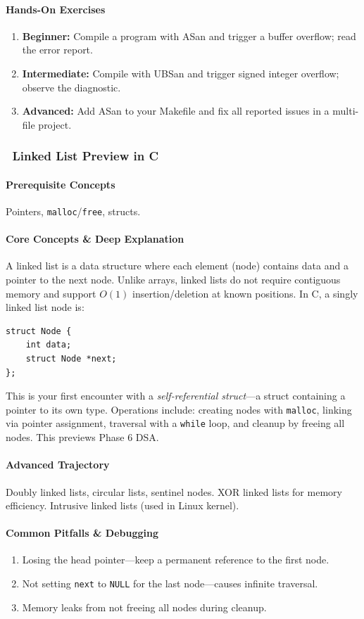 \documentclass[11pt, a4paper, oneside]{report}
\newcommand{\awareness}[1]{\subsubsection{\texorpdfstring{\fcolorbox{gray!50}{gray!10}{\footnotesize\bfseries\color{gray!50!black} AWARENESS}~#1}{#1}}}
\begin{document}
\paragraph{Hands-On Exercises}
\begin{enumerate}[leftmargin=*]
\item \textbf{Beginner:} Compile a program with ASan and trigger a buffer overflow; read the error report.
\item \textbf{Intermediate:} Compile with UBSan and trigger signed integer overflow; observe the diagnostic.
\item \textbf{Advanced:} Add ASan to your Makefile and fix all reported issues in a multi-file project.
\end{enumerate}

\awareness{Linked List Preview in C}

\paragraph{Prerequisite Concepts} Pointers, \texttt{malloc}/\texttt{free}, structs.

\paragraph{Core Concepts \& Deep Explanation} A linked list is a data structure where each element (node) contains data and a pointer to the next node. Unlike arrays, linked lists do not require contiguous memory and support $O(1)$ insertion/deletion at known positions. In C, a singly linked list node is:

\begin{verbatim}
struct Node {
    int data;
    struct Node *next;
};
\end{verbatim}

This is your first encounter with a \emph{self-referential struct}---a struct containing a pointer to its own type. Operations include: creating nodes with \texttt{malloc}, linking via pointer assignment, traversal with a \texttt{while} loop, and cleanup by freeing all nodes. This previews Phase 6 DSA.

\paragraph{Advanced Trajectory} Doubly linked lists, circular lists, sentinel nodes. XOR linked lists for memory efficiency. Intrusive linked lists (used in Linux kernel).

\paragraph{Common Pitfalls \& Debugging}
\begin{enumerate}[leftmargin=*]
\item Losing the head pointer---keep a permanent reference to the first node.
\item Not setting \texttt{next} to \texttt{NULL} for the last node---causes infinite traversal.
\item Memory leaks from not freeing all nodes during cleanup.
\end{enumerate}
\end{document}
